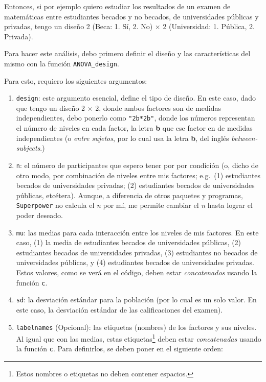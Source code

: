 \documentclass[
]{article}
\begin{document}
Entonces, si por ejemplo quiero estudiar los resultados de un examen de
matemáticas entre estudiantes becados y no becados, de universidades
públicas y privadas, tengo un diseño 2 (Beca: 1. Sí, 2. No) \(\times\) 2
(Universidad: 1. Pública, 2. Privada).

Para hacer este análisis, debo primero definir el diseño y las
características del mismo con la función \texttt{ANOVA\_design}.

Para esto, requiero los siguientes argumentos:

\begin{enumerate}
\def\labelenumi{\arabic{enumi}.}
\item
  \texttt{design}: este argumento esencial, define el tipo de diseño. En
  este caso, dado que tengo un diseño 2 \(\times\) 2, donde ambos
  factores son de medidas independientes, debo ponerlo como
  \texttt{"2b*2b"}, donde los números representan el número de niveles
  en cada factor, la letra \textbf{b} que ese factor en de medidas
  independientes (o \emph{entre sujetos}, por lo cual usa la letra
  \textbf{b}, del inglés \emph{between-subjects}.)
\item
  \texttt{n}: el número de participantes que espero tener por por
  condición (o, dicho de otro modo, por combinación de niveles entre mis
  factores; e.g.~(1) estudiantes becados de universidades privadas; (2)
  estudiantes becados de universidades públicas, etcétera). Aunque, a
  diferencia de otros paquetes y programas, \texttt{Superpower} no
  calcula el \emph{n} por mí, me permite cambiar el \emph{n} hasta
  lograr el poder deseado.
\item
  \texttt{mu}: las medias para cada interacción entre los niveles de mis
  factores. En este caso, (1) la media de estudiantes becados de
  universidades públicas, (2) estudiantes becados de universidades
  privadas, (3) estudiantes no becados de universidades públicas, y (4)
  estudiantes becados de universidades privadas. Estos valores, como se
  verá en el código, deben estar \emph{concatenados} usando la función
  \texttt{c}.
\item
  \texttt{sd}: la desviación estándar para la población (por lo cual es
  un solo valor. En este caso, la desviación estándar de las
  calificaciones del examen).
\item
  \texttt{labelnames} (Opcional): las etiquetas (nombres) de los
  factores y sus niveles. Al igual que con las medias, estas
  etiquetas\footnote{Estos nombres o etiquetas no deben contener
    espacios.} deben estar \emph{concatenadas} usando la función
  \texttt{c}. Para definirlos, se deben poner en el siguiente orden:


\end{enumerate}
\end{document}
